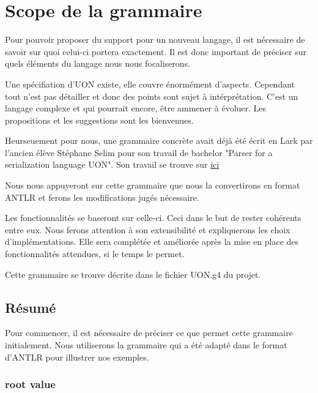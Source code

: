 \documentclass[
    iict, %
    il, %
]{heig-tb}
\begin{document}


\chapter{Scope de la grammaire}\label{grammar scope}
Pour pouvoir proposer du support pour un nouveau langage, il est nécessaire de savoir sur quoi celui-ci portera exactement.
Il est donc important de préciser sur quels éléments du langage nous nous focaliserons.

Une spécifiation d'UON existe, elle couvre énormément d'aspects. Cependant tout n'est pas détailler et donc des points sont sujet à intérprétation.
C'est un langage complexe et qui pourrait encore, être ammener à évoluer. Les propositions et les suggestions sont les bienvenues.

Heurseuement pour nous, une grammaire concrète avait déjà été écrit en Lark par l'ancien élève Stéphane Selim pour son travail de bachelor "Parser for a serialization language UON".
Son travail se trouve sur \href{https://github.com/uon-language/uon-parser}{ici}

Nous nous appuyeront sur cette grammaire que nous la convertirons en format ANTLR et ferons les modifications jugés nécessaire.

Les fonctionnalités se baseront sur celle-ci. Ceci dans le but de rester cohérents entre eux.
Nous ferons attention à son extensibilité et expliquerons les choix d'implémentations.
Elle sera complétée et améliorée après la mise en place des fonctionnalités attendues, si le temps le permet.

Cette grammaire se trouve décrite dans le fichier UON.g4 du projet.

\section{Résumé}
Pour commencer, il est nécessaire de préciser ce que permet cette grammaire initialement.
Nous utiliserons la grammaire qui a été adapté dans le format d'ANTLR pour illustrer nos exemples.


\subsection{root value}
\end{document}
